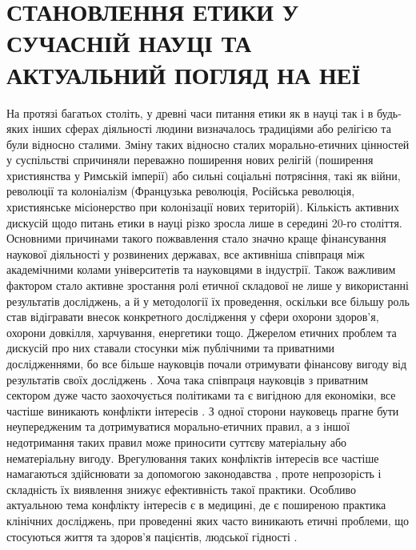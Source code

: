 \section[РОЗДІЛ 1. СТАНОВЛЕННЯ ЕТИКИ У СУЧАСНІЙ НАУЦІ ТА АКТУАЛЬНИЙ ПОГЛЯД НА НЕЇ]{СТАНОВЛЕННЯ ЕТИКИ У СУЧАСНІЙ НАУЦІ ТА АКТУАЛЬНИЙ ПОГЛЯД НА НЕЇ}

На протязі багатьох століть, у древні часи питання етики як в науці так і в будь-яких інших сферах діяльності людини визначалось традиціями або релігією та були відносно сталими. Зміну таких відносно сталих морально-етичних цінностей у суспільстві спричиняли переважно поширення нових релігій (поширення християнства у Римській імперії) або сильні соціальні потрясіння, такі як війни, революції та колоніалізм (Французька революція, Російська революція, християнське місіонерство при колонізації нових територій). Кількість активних дискусій щодо питань етики в науці різко зросла лише в середині 20-го століття. Основними причинами такого пожвавлення стало значно краще фінансування наукової діяльності у розвинених державах, все активніша співпраця між академічними колами університетів та науковцями в індустрії. Також важливим фактором стало активне зростання ролі етичної складової не лише у використанні результатів досліджень, а й у методології їх проведення, оскільки все більшу роль став відігравати внесок конкретного дослідження у сфери охорони здоров'я, охорони довкілля, харчування, енергетики тощо. Джерелом етичних проблем та дискусій про них ставали стосунки між публічними та приватними дослідженнями, бо все більше науковців почали отримувати фінансову вигоду від результатів своїх досліджень \cite{Iaccarino2001-ju}. Хоча така співпраця науковців з приватним сектором дуже часто заохочується політиками та є вигідною для економіки, все частіше виникають конфлікти інтересів \cite{cech2001conflicts}. З одної сторони науковець прагне бути неупередженим та дотримуватися морально-етичних правил, а з іншої недотримання таких правил може приносити суттєву матеріальну або нематеріальну вигоду. Врегулювання таких конфліктів інтересів все частіше намагаються здійснювати за допомогою законодавства \cite{Smaglik2000}, проте непрозорість і складність їх виявлення знижує ефективність такої практики. Особливо актуальною тема конфлікту інтересів є в медицині, де є поширеною практика клінічних досліджень, при проведенні яких часто виникають етичні проблеми, що стосуються життя та здоров'я пацієнтів, людської гідності \cite{Leader2003}\cite[208]{FrameworkForAction}.

